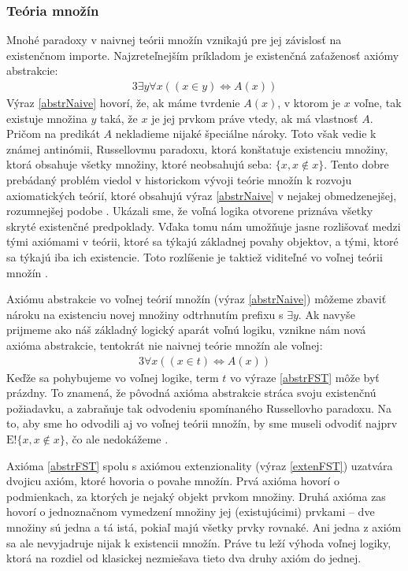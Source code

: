 \documentclass[12pt, letterpaper]{article}
\begin{document}
\subsubsection{Teória množín}
Mnohé paradoxy v naivnej teórii množín vznikajú pre jej závislosť na existenčnom importe. Najzreteľnejším príkladom je existenčná zaťaženosť axiómy abstrakcie:
\begin{alignat}{3}
 	\exists y \forall x ((x \in y) \iff A(x))\label{abstrNaive}
\end{alignat}
\noindent Výraz \ref{abstrNaive} hovorí, že, ak máme tvrdenie $A(x)$, v ktorom je $x$ voľne, tak existuje množina $y$ taká, že $x$ je jej prvkom práve vtedy, ak má vlastnosť $A$. Pričom na predikát $A$ nekladieme nijaké špeciálne nároky. Toto však vedie k známej antinómii, Russellovmu paradoxu, ktorá konštatuje existenciu množiny, ktorá obsahuje všetky množiny, ktoré neobsahujú seba: $\{x, x \notin x\}$. Tento dobre prebádaný problém viedol v historickom vývoji teórie množín k rozvoju axiomatických teórií, ktoré obsahujú výraz \ref{abstrNaive} v nejakej obmedzenejšej, rozumnejšej podobe \parencites[1]{BencivengaTM}. Ukázali sme, že voľná logika otvorene priznáva všetky skryté existenčné predpoklady. Vďaka tomu nám umožňuje jasne rozlišovať medzi tými axiómami v teórii, ktoré sa týkajú základnej povahy objektov, a tými, ktoré sa týkajú iba ich existencie. Toto rozlíšenie je taktiež viditeľné vo voľnej teórii množín \parencites[1044]{Nolt2007}.\par
Axiómu abstrakcie vo voľnej teórií množín (výraz \ref{abstrNaive}) môžeme zbaviť nároku na existenciu novej množiny odtrhnutím prefixu s $\exists y$. Ak navyše prijmeme ako náš základný logický aparát voľnú logiku, vznikne nám nová axióma abstrakcie, tentokrát nie naivnej teórie množín ale voľnej:
\begin{alignat}{3}
 	\forall x ((x \in t) \iff A(x))\label{abstrFST}
\end{alignat}
\noindent Keďže sa pohybujeme vo voľnej logike, term $t$ vo výraze \ref{abstrFST} môže byť prázdny. To znamená, že pôvodná axióma abstrakcie stráca svoju existenčnú požiadavku, a zabraňuje tak odvodeniu spomínaného Russellovho paradoxu. Na to, aby sme ho odvodili aj vo voľnej teórii množín, by sme museli odvodiť najprv $\text{E}! \{x, x \notin x\}$, čo ale nedokážeme \parencites[4--5]{BencivengaTM}[1044--1045]{Nolt2007}.\par
Axióma \ref{abstrFST} spolu s axiómou extenzionality (výraz \ref{extenFST}) uzatvára dvojicu axióm, ktoré hovoria o povahe množín. Prvá axióma hovorí o podmienkach, za ktorých je nejaký objekt prvkom množiny. Druhá axióma zas hovorí o jednoznačnom vymedzení množiny jej (existujúcimi) prvkami -- dve množiny sú jedna a tá istá, pokiaľ majú všetky prvky rovnaké. Ani jedna z axióm sa ale nevyjadruje nijak k existencii množín. Práve tu leží výhoda voľnej logiky, ktorá na rozdiel od klasickej nezmiešava tieto dva druhy axióm do jednej.
\end{document}
